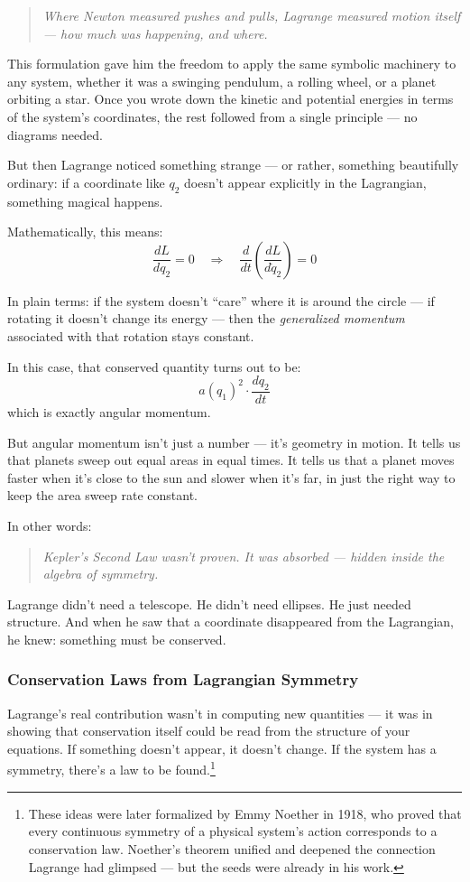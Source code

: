 \begin{quote}
\textit{Where Newton measured pushes and pulls, Lagrange measured motion itself — how much was happening, and where.}
\end{quote}

This formulation gave him the freedom to apply the same symbolic machinery to any system, whether it was a swinging pendulum, a rolling wheel, or a planet orbiting a star. Once you wrote down the kinetic and potential energies in terms of the system's coordinates, the rest followed from a single principle — no diagrams needed.

But then Lagrange noticed something strange — or rather, something beautifully ordinary: if a coordinate like \( q_2 \) doesn't appear explicitly in the Lagrangian, something magical happens.

Mathematically, this means:
\[
\frac{dL}{dq_2} = 0 \quad \Rightarrow \quad \frac{d}{dt} \left( \frac{dL}{d\dot{q}_2} \right) = 0
\]

In plain terms: if the system doesn’t “care” where it is around the circle — if rotating it doesn’t change its energy — then the \textit{generalized momentum} associated with that rotation stays constant.

In this case, that conserved quantity turns out to be:
\[
a(q_1)^2 \cdot \frac{dq_2}{dt}
\]
which is exactly angular momentum.

But angular momentum isn’t just a number — it’s geometry in motion. It tells us that planets sweep out equal areas in equal times. It tells us that a planet moves faster when it's close to the sun and slower when it's far, in just the right way to keep the area sweep rate constant.

In other words:
\begin{quote}
\textit{Kepler’s Second Law wasn’t proven. It was absorbed — hidden inside the algebra of symmetry.}
\end{quote}

Lagrange didn’t need a telescope. He didn’t need ellipses. He just needed structure. And when he saw that a coordinate disappeared from the Lagrangian, he knew: something must be conserved.

\subsubsection{Conservation Laws from Lagrangian Symmetry}

Lagrange’s real contribution wasn’t in computing new quantities — it was in showing that conservation itself could be read from the structure of your equations. If something doesn’t appear, it doesn’t change. If the system has a symmetry, there’s a law to be found.\footnote{These ideas were later formalized by Emmy Noether in 1918, who proved that every continuous symmetry of a physical system's action corresponds to a conservation law. Noether’s theorem unified and deepened the connection Lagrange had glimpsed — but the seeds were already in his work.}

